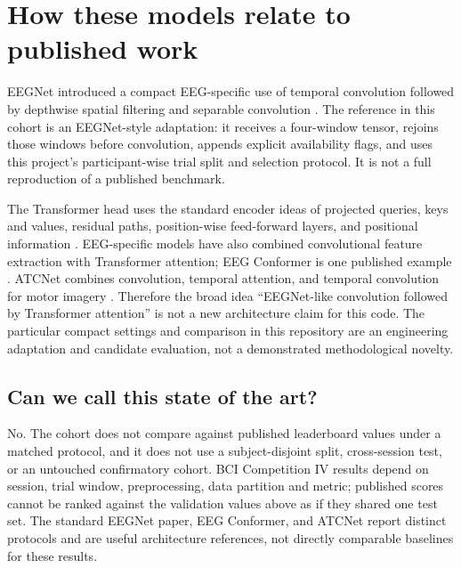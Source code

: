 \documentclass[11pt,a4paper]{article}
\begin{document}
\newpage
\section{How these models relate to published work}
EEGNet introduced a compact EEG-specific use of temporal convolution followed
by depthwise spatial filtering and separable convolution \cite{eegnet}. The
reference in this cohort is an EEGNet-style adaptation: it receives a
four-window tensor, rejoins those windows before convolution, appends explicit
availability flags, and uses this project's participant-wise trial split and
selection protocol. It is not a full reproduction of a published benchmark.

The Transformer head uses the standard encoder ideas of projected queries,
keys and values, residual paths, position-wise feed-forward layers, and
positional information \cite{attention}. EEG-specific models have also
combined convolutional feature extraction with Transformer attention; EEG
Conformer is one published example \cite{eegconformer}. ATCNet combines
convolution, temporal attention, and temporal convolution for motor imagery
\cite{atcnet}. Therefore the broad
idea ``EEGNet-like convolution followed by Transformer attention'' is not a
new architecture claim for this code. The particular compact settings and
comparison in this repository are an engineering adaptation and candidate
evaluation, not a demonstrated methodological novelty.

\subsection*{Can we call this state of the art?}
No. The cohort does not compare against published leaderboard values under a
matched protocol, and it does not use a subject-disjoint split, cross-session
test, or an untouched confirmatory cohort. BCI Competition IV results depend
on session, trial window, preprocessing, data partition and metric; published
scores cannot be ranked against the validation values above as if they shared
one test set. The standard EEGNet paper, EEG Conformer, and ATCNet report distinct
protocols and are useful architecture references, not directly comparable
baselines for these results.
\end{document}
